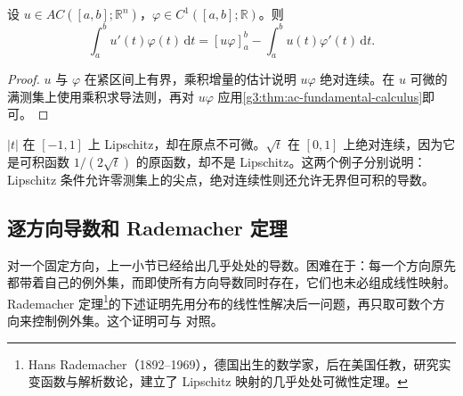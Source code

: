 \begin{corollary}\label{g3:cor:ac-integration-parts}
	设 \(u\in AC([a,b];\mathbb R^n)\)，\(\varphi\in C^1([a,b];\mathbb R)\)。则
	\[
		\int_a^b u'(t)\varphi(t)\,\mathrm dt
		=[u\varphi]_a^b-\int_a^b u(t)\varphi'(t)\,\mathrm dt.
	\]
\end{corollary}
\begin{proof}
	\(u\) 与 \(\varphi\) 在紧区间上有界，乘积增量的估计说明 \(u\varphi\) 绝对连续。在 \(u\) 可微的满测集上使用乘积求导法则，再对 \(u\varphi\) 应用\cref{g3:thm:ac-fundamental-calculus}即可。
\end{proof}

\begin{example}\label{g3:exm:ac-lipschitz-distinction}
	\(|t|\) 在 \([-1,1]\) 上 Lipschitz，却在原点不可微。\(\sqrt t\) 在 \([0,1]\) 上绝对连续，因为它是可积函数 \(1/(2\sqrt t)\) 的原函数，却不是 Lipschitz。这两个例子分别说明：Lipschitz 条件允许零测集上的尖点，绝对连续性则还允许无界但可积的导数。
\end{example}

\subsection{逐方向导数和 Rademacher 定理}
\label{g3:subsec:2002:02}
对一个固定方向，上一小节已经给出几乎处处的导数。困难在于：每一个方向原先都带着自己的例外集，而即使所有方向导数同时存在，它们也未必组成线性映射。Rademacher 定理\footnote{Hans Rademacher（1892--1969），德国出生的数学家，后在美国任教，研究实变函数与解析数论，建立了 Lipschitz 映射的几乎处处可微性定理。}的下述证明先用分布的线性性解决后一问题，再只取可数个方向来控制例外集。这个证明可与 \cite[第5节，定理5.2，第30--32页]{Simon1983} 对照。

